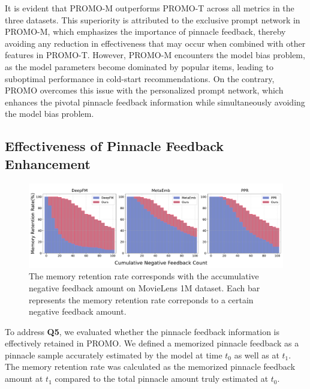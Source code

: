 \documentclass[sigconf]{acmart}
\newcommand{\sys}{\textsc{PROMO}\xspace}
\begin{document}
It is evident that \sys-M outperforms \sys-T across all metrics in the three datasets. 
This superiority is attributed to the exclusive prompt network in \sys-M, which emphasizes the importance of pinnacle feedback, thereby avoiding any reduction in effectiveness that may occur when combined with other features in \sys-T.
However, \sys-M encounters the model bias problem, as the model parameters become dominated by popular items, leading to suboptimal performance in cold-start recommendations. 
On the contrary, \sys overcomes this issue with the personalized prompt network, which enhances the pivotal pinnacle feedback information while simultaneously avoiding the model bias problem.

\subsection{Effectiveness of Pinnacle Feedback Enhancement} 
\begin{figure}[t]
\centering
\includegraphics[width=\linewidth]{./figure/observation_neg_movielens1m.pdf}
\caption{The memory retention rate corresponds with the accumulative negative feedback amount on MovieLens 1M dataset. Each bar represents the memory retention rate correponds to a certain negative feedback amount. }
\label{observation_neg}

\end{figure}

To address \textbf{Q5}, we evaluated whether the pinnacle feedback information is effectively retained in \sys. 
We defined a memorized pinnacle feedback as a pinnacle sample accurately estimated by the model at time $t_0$ as well as at $t_1$. 
The memory retention rate was calculated as the memorized pinnacle feedback amount at $t_1$ compared to the total pinnacle amount truly estimated at $t_0$.
\end{document}
